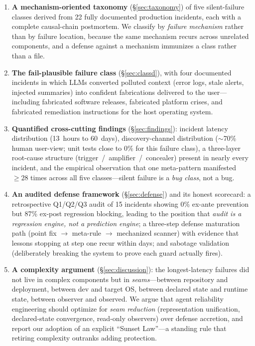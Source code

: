 \begin{enumerate}

\item \textbf{A mechanism-oriented taxonomy} (\S\ref{sec:taxonomy}) of
five silent-failure classes derived from 22 fully documented production
incidents, each with a complete causal-chain postmortem. We classify by
\emph{failure mechanism} rather than by failure location, because the
same mechanism recurs across unrelated components, and a defense against
a mechanism immunizes a class rather than a file.

\item \textbf{The fail-plausible failure class} (\S\ref{sec:classd}),
with four documented incidents in which LLMs converted polluted context
(error logs, stale alerts, injected summaries) into confident
fabrications delivered to the user---including fabricated software
releases, fabricated platform crises, and fabricated remediation
instructions for the host operating system.

\item \textbf{Quantified cross-cutting findings} (\S\ref{sec:findings}):
incident latency distribution (13~hours to 60~days), discovery-channel
distribution ($\sim$70\% human user-view; unit tests close to 0\% for
this failure class), a three-layer root-cause structure
(trigger~/~amplifier~/~concealer) present in nearly every incident, and
the empirical observation that one meta-pattern manifested ${\geq}28$
times across all five classes---silent failure is a \emph{bug class}, not
a bug.

\item \textbf{An audited defense framework} (\S\ref{sec:defense}) and its
honest scorecard: a retrospective Q1/Q2/Q3 audit of 15 incidents showing
0\% ex-ante prevention but 87\% ex-post regression blocking, leading to
the position that \emph{audit is a regression engine, not a prediction
engine}; a three-step defense maturation path (point fix $\rightarrow$
meta-rule $\rightarrow$ mechanized scanner) with evidence that lessons
stopping at step one recur within days; and sabotage validation
(deliberately breaking the system to prove each guard actually fires).

\item \textbf{A complexity argument} (\S\ref{sec:discussion}): the
longest-latency failures did not live in complex components but in
\emph{seams}---between repository and deployment, between dev and target
OS, between declared state and runtime state, between observer and
observed. We argue that agent reliability engineering should optimize for
\emph{seam reduction} (representation unification, declared-state
convergence, read-only observers) over defense accretion, and report our
adoption of an explicit ``Sunset Law''---a standing rule that retiring
complexity outranks adding protection.

\end{enumerate}


